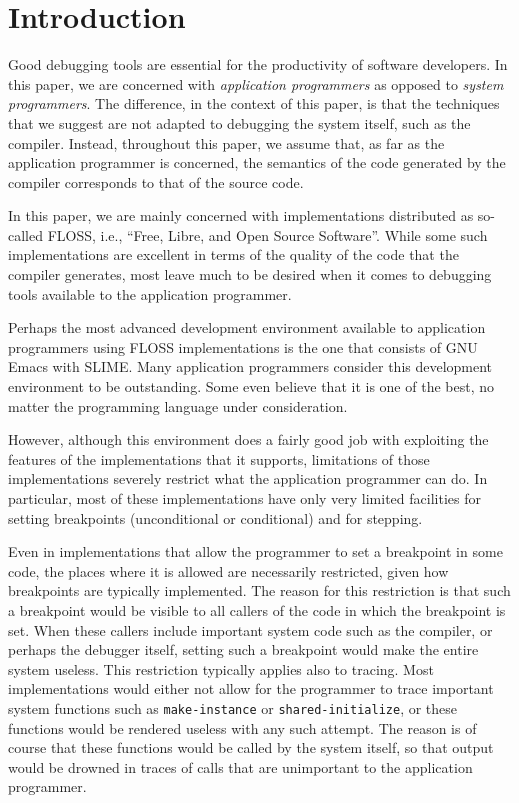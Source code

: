 \section{Introduction}
\label{sec-introduction}

Good debugging tools are essential for the productivity of software
developers.  In this paper, we are concerned with \emph{application
  programmers} as opposed to \emph{system programmers}.  The
difference, in the context of this paper, is that the techniques that
we suggest are not adapted to debugging the system itself, such as the
compiler.  Instead, throughout this paper, we assume that, as far as
the application programmer is concerned, the semantics of the code
generated by the compiler corresponds to that of the source code.

In this paper, we are mainly concerned with \commonlisp{}
implementations distributed as so-called FLOSS, i.e., ``Free, Libre,
and Open Source Software''.  While some such implementations are
excellent in terms of the quality of the code that the compiler
generates, most leave much to be desired when it comes to debugging
tools available to the application programmer.

Perhaps the most advanced development environment available to
application programmers using FLOSS \commonlisp{} implementations is
the one that consists of GNU Emacs with SLIME.  Many application
programmers consider this development environment to be outstanding.
Some even believe that it is one of the best, no matter the
programming language under consideration.

However, although this environment does a fairly good job with
exploiting the features of the \commonlisp{} implementations that it
supports, limitations of those implementations severely restrict what
the application programmer can do.  In particular, most of these
implementations have only very limited facilities for setting
breakpoints (unconditional or conditional) and for stepping.

Even in implementations that allow the programmer to set a breakpoint
in some code, the places where it is allowed are necessarily
restricted, given how breakpoints are typically implemented.  The
reason for this restriction is that such a breakpoint would be visible
to all callers of the code in which the breakpoint is set.  When these
callers include important system code such as the compiler, or perhaps
the debugger itself, setting such a breakpoint would make the entire
system useless.  This restriction typically applies also to tracing.
Most \commonlisp{} implementations would either not allow for the
programmer to trace important system functions such as
\texttt{make-instance} or \texttt{shared-initialize}, or these
functions would be rendered useless with any such attempt.  The reason
is of course that these functions would be called by the system
itself, so that output would be drowned in traces of calls that are
unimportant to the application programmer.

